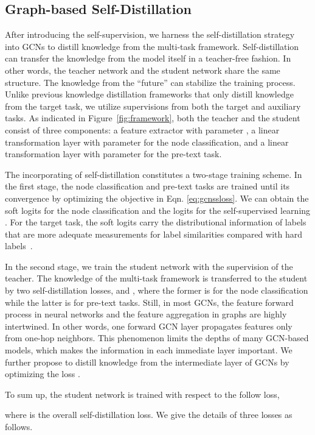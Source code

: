 \documentclass[letterpaper]{article} \usepackage{aaai22} \usepackage{times} \usepackage{helvet} \usepackage{courier} \usepackage[hyphens]{url} \usepackage{graphicx} \urlstyle{rm} \def\UrlFont{\rm} \usepackage{subfigure}
\begin{document}
	
	\subsection{Graph-based Self-Distillation}
	After introducing the self-supervision, we harness the self-distillation strategy into GCNs to distill knowledge from the multi-task framework. Self-distillation can transfer the knowledge from the model itself in a teacher-free fashion. In other words, the teacher network and the student network share the same structure. The knowledge from the ``future'' can stabilize the training process. Unlike previous knowledge distillation frameworks that only distill knowledge from the target task, we utilize supervisions from both the target and auxiliary tasks. As indicated in Figure~\ref{fig:framework}, both the teacher and the student consist of three components: a feature extractor  with parameter , a linear transformation layer  with parameter  for the node classification, and a linear transformation layer  with parameter  for the pre-text task.
	
	The incorporating of self-distillation constitutes a two-stage training scheme. In the first stage, the node classification and pre-text tasks are trained until its convergence by optimizing the objective in Eqn. \ref{eq:gcnssloss}. We can obtain the soft logits  for the node classification and the logits  for the self-supervised learning . For the target task, the soft logits carry the distributional information of labels that are more adequate measurements for label similarities compared with hard labels~\cite{hinton2015distilling}.
	
	In the second stage, we train the student network with the supervision of the teacher. The knowledge of the multi-task framework is transferred to the student by two self-distillation losses,  and , where the former is for the node classification while the latter is for pre-text tasks. Still, in most GCNs, the feature forward process in neural networks and the feature aggregation in graphs are highly intertwined. In other words, one forward GCN layer propagates features only from one-hop neighbors. This phenomenon limits the depths of many GCN-based models, which makes the information in each immediate layer important. We further propose to distill knowledge from the intermediate layer of GCNs by optimizing the loss . 
	
	To sum up, the student network is trained with respect to the follow loss,
	
	where  is the overall self-distillation loss. We give the details of three losses as follows.
	
\end{document}
